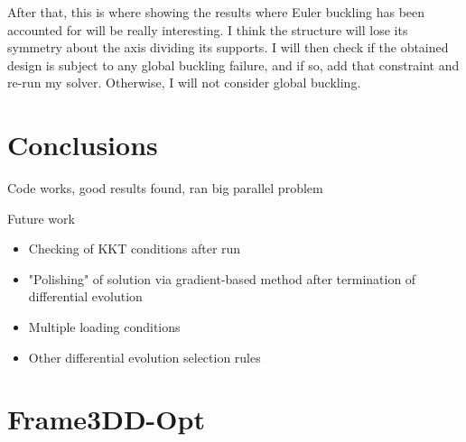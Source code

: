 \documentclass{article}
\begin{document}
After that, this is where showing the results where Euler buckling
has been accounted for will be really interesting. I think the structure
will lose its symmetry about the axis dividing its supports. I will then
check if the obtained design is subject to any global buckling failure,
and if so, add that constraint and re-run my solver. Otherwise, I will not
consider global buckling.

\section{Conclusions}
Code works, good results found, ran big parallel problem

Future work
\begin{itemize}
  \item Checking of KKT conditions after run
  \item "Polishing" of solution via gradient-based method after termination of differential evolution
  \item Multiple loading conditions
  \item Other differential evolution selection rules
\end{itemize}

\printbibliography

\appendix

\section{Frame3DD-Opt}

\end{document}

